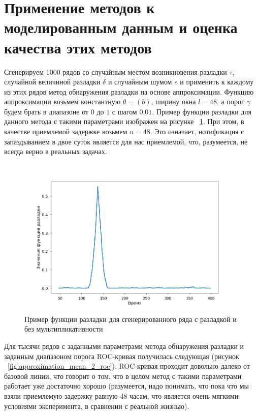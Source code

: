 \documentclass[%
12pt,
master,  %
natbib,      %
subf,        %
substylefile = spbu.rtx,
href,        %
colorlinks,  %
]{disser}
\begin{document}


\section{Применение методов к моделированным данным и оценка качества этих методов}

Сгенерируем 1000 рядов со случайным местом возникновения разладки $\tau$, случайной величиной разладки $\delta$ и случайным шумом $e$ и применить к каждому из этих рядов метод обнаружения разладки на основе аппроксимации. Функцию аппроксимации возьмем константную $\theta = (b)$, ширину окна $l = 48$, а порог $\gamma$ будем брать в диапазоне от $0$ до $1$ с шагом $0.01$. Пример функции разладки для данного метода с такими параметрами изображен на рисунке  ~\ref{fig:approximation_mean_1}. При этом, в качестве приемлемой задержке возьмем $u = 48$. Это означает, нотификация с запаздыванием в двое суток является для нас приемлемой, что, разумеется, не всегда верно в реальных задачах.

\begin{figure}[!hhh]
	\begin{center}
		\includegraphics[width=12cm]{approximation_mean_1}
	\end{center}
	\vspace{-5mm}\caption{Пример функции разладки для сгенерированного ряда с разладкой и без мультипликативности}
	\label{fig:approximation_mean_1}
\end{figure}

Для тысячи рядов с заданными параметрами метода обнаружения разладки и заданным диапазоном порога ROC-кривая получилась следующая (рисунок ~\ref{fig:approximation_mean_2_roc}). ROC-кривая проходит довольно далеко от базовой линии, что говорит о том, что в целом метод с такими параметрами работает уже достаточно хорошо (разумеется, надо понимать, что пока что мы взяли приемлемую задержку равную 48 часам, что является очень мягкими условиями эксперимента, в сравнении с реальной жизнью). 
\end{document}
